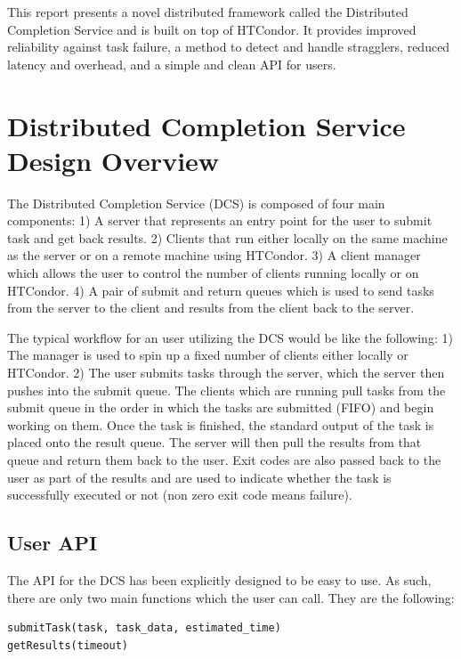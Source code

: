 \documentclass{article}
\begin{document}
This report presents a novel distributed framework called the Distributed Completion Service and is built on top of HTCondor. It provides improved reliability against task failure, a method to detect and handle stragglers, reduced latency and overhead, and a simple and clean API for users.

\section{Distributed Completion Service Design Overview}

The Distributed Completion Service (DCS) is composed of four main components: 1) A server that represents an entry point for the user to submit task and get back results. 2) Clients that run either locally on the same machine as the server or on a remote machine using HTCondor. 3) A client manager which allows the user to control the number of clients running locally or on HTCondor. 4) A pair of submit and return queues which is used to send tasks from the server to the client and results from the client back to the server.

The typical workflow for an user utilizing the DCS would be like the following: 1) The manager is used to spin up a fixed number of clients either locally or HTCondor. 2) The user submits tasks through the server, which the server then pushes into the submit queue. The clients which are running pull tasks from the submit queue in the order in which the tasks are submitted (FIFO) and begin working on them. Once the task is finished, the standard output of the task is placed onto the result queue. The server will then pull the results from that queue and return them back to the user. Exit codes are also passed back to the user as part of the results and are used to indicate whether the task is successfully executed or not (non zero exit code means failure).

\subsection{User API}

The API for the DCS has been explicitly designed to be easy to use. As such, there are only two main functions which the user can call. They are the following:

\begin{lstlisting}[language=Python]
submitTask(task, task_data, estimated_time)
getResults(timeout)
\end{lstlisting}
\end{document}
